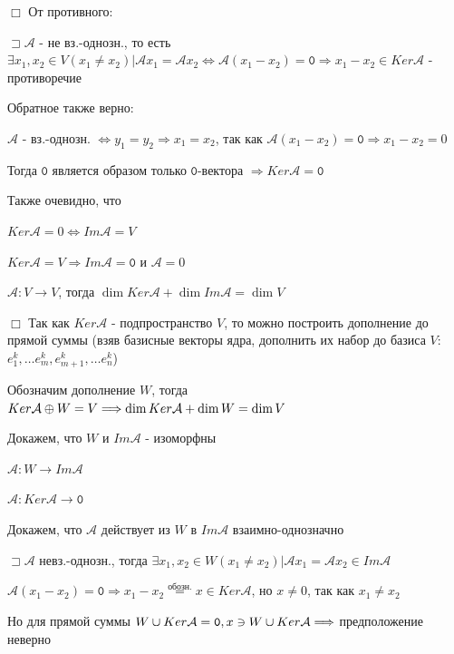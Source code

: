 \documentclass[12pt]{article}
\begin{document}
    $\Box$ От противного:

    $\sqsupset \mathcal{A}$ - не вз.-однозн., то есть $\exists x_1, x_2 \in V (x_1 \neq x_2) | \mathcal{A}x_1 = \mathcal{A}x_2 \Longleftrightarrow \mathcal{A} (x_1 - x_2) = \texttt{0} \Longrightarrow x_1 - x_2 \in Ker \mathcal{A}$ - противоречие

    \Nota Обратное также верно:

    $\mathcal{A}$ - вз.-однозн. $\Longleftrightarrow y_1 = y_2 \Longrightarrow x_1 = x_2$, так как $\mathcal{A}(x_1 - x_2) = \texttt{0} \Longrightarrow x_1 - x_2 = 0$

    Тогда $\texttt{0}$ является образом только $\texttt{0}$-вектора $\Longrightarrow Ker \mathcal{A} = \texttt{0}$

    \Nota Также очевидно, что

    $Ker \mathcal{A} = 0 \Longleftrightarrow Im \mathcal{A} = V$

    $Ker \mathcal{A} = V \Longrightarrow Im \mathcal{A} = \texttt{0}$ и $\mathcal{A} = 0$

    \hypertarget{theoremaboutdimensions}{}

    \Th $\mathcal{A} : V \rightarrow V$, тогда $\dim Ker \mathcal{A} + \dim Im \mathcal{A} = \dim V$

    $\Box$ Так как $Ker \mathcal{A}$ - подпространство $V$, то можно построить дополнение до прямой суммы (взяв базисные векторы ядра, дополнить их набор до базиса $V$: $e^k_1, \dots e^k_m, e^k_{m+1}, \dots e^k_n$)

    Обозначим дополнение $W$, тогда $Ker \mathcal{A} \oplus W = V \Longrightarrow \dim Ker \mathcal{A} + \dim W = \dim V$

    Докажем, что $W$ и $Im \mathcal{A}$ - изоморфны

    $\mathcal{A} : W \rightarrow Im \mathcal{A}$

    $\mathcal{A} : Ker \mathcal{A} \rightarrow \texttt{0}$

    Докажем, что $\mathcal{A}$ действует из $W$ в $Im \mathcal{A}$ взаимно-однозначно

    $\sqsupset \mathcal{A}$ невз.-однозн., тогда $\exists x_1, x_2 \in W (x_1 \neq x_2) | \mathcal{A}x_1 = \mathcal{A}x_2 \in Im \mathcal{A}$

    $\mathcal{A}(x_1 - x_2) = \texttt{0} \Longrightarrow x_1 - x_2 \stackrel{\text{обозн.}}{=} x \in Ker \mathcal{A}$, но $x \neq 0$, так как $x_1 \neq x_2$

    Но для прямой суммы $W \cup Ker \mathcal{A} = \texttt{0}, x \ni W \cup Ker \mathcal{A} \Longrightarrow$ предположение неверно
\end{document}
